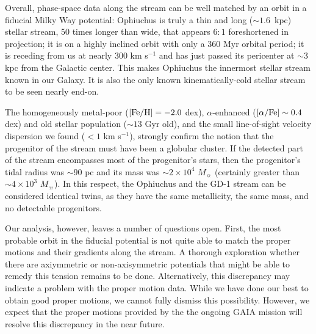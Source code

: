 \documentclass[iop]{emulateapj}
\begin{document}
Overall, phase-space data along the stream can be well matched by an orbit in a
fiducial Milky Way potential: Ophiuchus is truly a thin and long ($\sim1.6$~kpc)
stellar stream, 50 times longer than wide, that appears $6:1$ foreshortened in
projection; it is on a highly inclined orbit with only a 360 Myr orbital period;
it is receding from us at nearly 300 km s$^{-1}$ and has just passed its
pericenter at $\sim3$ kpc from the Galactic center. This makes Ophiuchus the
innermost stellar stream known in our Galaxy. It is also the only known
kinematically-cold stellar stream to be seen nearly end-on.

The homogeneously metal-poor (${\rm [Fe/H]}=-2.0$ dex), $\alpha$-enhanced
(${\rm [\alpha/Fe]\sim0.4}$ dex) and old stellar population ($\sim13$ Gyr old),
and the small line-of-sight velocity dispersion we found ($<1$ km s$^{-1}$),
strongly confirm the notion that the progenitor of the stream must have been a
globular cluster. If the detected part of the stream encompasses most of the
progenitor's stars, then the progenitor's tidal radius was $\sim90$ pc and its
mass was $\sim2\times10^4$ $M_\sun$ (certainly greater than $\sim4\times10^3$
$M_\sun$). In this respect, the Ophiuchus and the GD-1 stream \citep{gd06,kop10}
can be considered identical twins, as they have the same metallicity, the same
mass, and no detectable progenitors.

Our analysis, however, leaves a number of questions open. First, the most
probable orbit in the fiducial potential is not quite able to match the proper
motions and their gradients along the stream. A thorough exploration whether
there are axiymmetric or non-axisymmetric potentials that might be able to
remedy this tension remains to be done. Alternatively, this discrepancy may
indicate a problem with the proper motion data. While we have done our best to
obtain good proper motions, we cannot fully dismiss this possibility. However,
we expect that the proper motions provided by the the ongoing GAIA mission
\citep{per01} will resolve this discrepancy in the near future.
\end{document}
